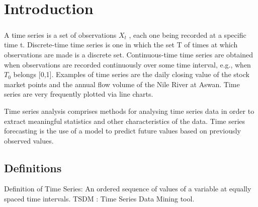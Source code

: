 \documentclass[12pt,a4paper]{report}
\begin{document}
\tableofcontents

\newpage
{}
\listoffigures

\newpage

\listoftables
\newpage

\setcounter{page}{1}

\pagestyle{fancy}
\chead{}
\rfoot{\small{\thepage}}
\renewcommand{\headrulewidth}{0.4pt}
\renewcommand{\footrulewidth}{0.4pt}
\linespread{1.5}
\chapter{Introduction}
\paragraph{} A time series is a set of observations $X_t$ , each one being recorded at a specific time t. Discrete-time time series is one in which the set T of times at which observations are made is a discrete set. Continuous-time time series are obtained when observations are recorded continuously over some time interval, e.g., when $T_0$ belongs [0,1]. Examples of time series are the daily closing value of the stock market points and the annual flow volume of the Nile River at Aswan. Time series are very frequently plotted via line charts.


 Time series analysis comprises methods for analysing time series data in order to extract meaningful statistics and other characteristics of the data. Time series forecasting is the use of a model to predict future values based on previously observed values.  
\section{Definitions}
Definition of Time Series: An ordered sequence of values of a variable at equally spaced time intervals.
TSDM : Time Series Data Mining tool.
\end{document}
